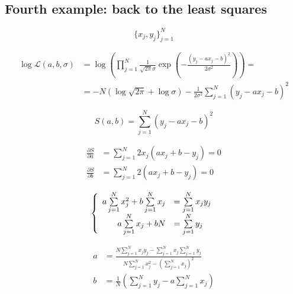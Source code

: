 \documentclass{article}
\begin{document}
\subsection{Fourth example: back to the least squares}
$$
\{x_j, y_j\}_{j=1}^{N}
$$

\begin{align*}
\log \mathcal{L}(a, b,\sigma) & = \log \left(\prod\limits_{j=1}^N  \frac{1}{\sqrt{2\pi}\sigma} \exp\left(-\frac{(y_j - a x_j - b)^2}{2\sigma^2}\right)\right) =\\
& = -N \left(\log\sqrt{2\pi} + \log\sigma\right) - \frac{1}{2\sigma^2} \sum\limits_{j=1}^N (y_j- a x_j - b)^2
\end{align*}


$$
S(a, b) = \sum\limits_{j=1}^N (y_j- a x_j - b)^2
$$


\begin{align*}
\frac{\partial S}{\partial a} &= \sum\limits_{j=1}^N 2 x_j (a x_j + b - y_j) = 0 \\
\frac{\partial S}{\partial b} &= \sum\limits_{j=1}^N 2 (a x_j + b - y_j) = 0
\end{align*}

$$
\left \{ \begin{array}{r l}
a \sum\limits_{j=1}^N x_j^2 + b \sum\limits_{j=1}^N x_j  & = \sum\limits_{j=1}^N x_j y_j\\
a \sum\limits_{j=1}^N x_j   + b N                        & = \sum\limits_{j=1}^N y_j
\end{array} \right.
$$

\begin{align*}
a &= \frac{N \sum\limits_{j=1}^N x_j y_j - \sum\limits_{j=1}^N x_j \sum\limits_{j=1}^N y_j}{N\sum\limits_{j=1}^N x_j^2 - \left(\sum\limits_{j=1}^N x_j\right)^2} \\
b &= \frac{1}{N}\left(  \sum\limits_{j=1}^N y_j - a  \sum\limits_{j=1}^N x_j \right)
\end{align*}
\end{document}
